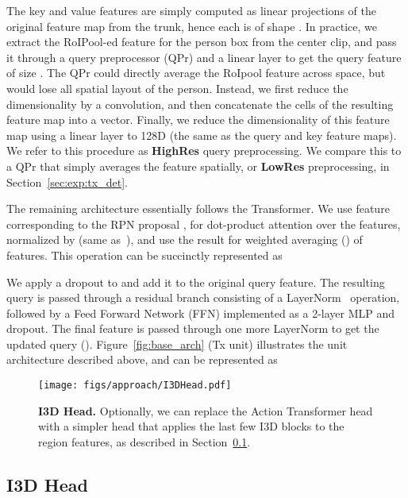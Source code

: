 \documentclass[10pt,twocolumn,letterpaper]{article}
\newcommand{\Tx}[0]{Action Transformer}
\newcommand{\QPr}[0]{QPr}
\newcommand{\qprconcat}[0]{HighRes}
\newcommand{\qpravg}[0]{LowRes}
\begin{document}
The key
and value features are simply computed as linear projections  of the
original feature map from the trunk, hence each is of shape .
In practice, we extract
the RoIPool-ed feature for the person box from the center clip, 
and
pass it through a query preprocessor (\QPr{}) 
and a linear layer 
to get
the query feature of size .  The \QPr{} could directly
average the RoIpool feature across space,
but would lose all spatial layout of the person.  Instead,
we first reduce the
dimensionality by a  convolution, and then concatenate the cells of the resulting
 feature map into a vector.  Finally, we reduce the
dimensionality of this feature map using a linear layer to 128D 
(the same as the query and key feature maps).
We refer to this procedure as {\bf
\qprconcat{}} query preprocessing.  We compare this to a \QPr{} that simply averages the
feature spatially, or {\bf \qpravg{}} preprocessing, in Section~\ref{sec:exp:tx_det}.



The remaining architecture essentially follows the Transformer. We use feature  corresponding to the RPN proposal , for dot-product attention over the  features, normalized by  (same as~\cite{vaswani2017attention}), and use the result for weighted averaging () of  features. This operation can be succinctly represented as

We apply a dropout to  and add it to the original query feature. The resulting query is 
passed through a residual branch consisting of a LayerNorm~\cite{ba2016layer} operation, followed by a Feed Forward Network (FFN) implemented as a 2-layer MLP and dropout.
The final feature is passed through one more LayerNorm to get the updated query ().
Figure~\ref{fig:base_arch} (Tx unit) illustrates the unit architecture described above, and can be represented as


\begin{figure}[t]
\centering
\texttt{[image: figs/approach/I3DHead.pdf]}
\caption{
{\bf I3D Head.}
Optionally, we can replace the \Tx{} head with a simpler head that applies the last few I3D blocks to the region features,
as described in Section~\ref{sec:app:i3d_head}.
}\label{fig:i3d_head_arch}
\end{figure}

\subsection{I3D Head}\label{sec:app:i3d_head}
\end{document}
